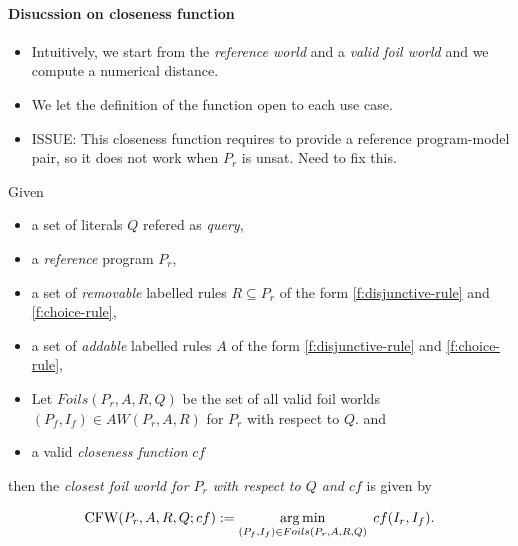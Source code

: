 \paragraph{Disucssion on closeness function}
\begin{itemize}
  \item Intuitively, we start from the \emph{reference world} and a \emph{valid foil world} and we compute a numerical distance.
  \item We let the definition of the function open to each use case.
  \item {\color{red} ISSUE: This closeness function requires to provide a reference program-model pair, so it does not work when $P_r$ is unsat. Need to fix this.}
\end{itemize}

\begin{definition}
  Given
  \begin{itemize}
    \item a set of literals $Q$ refered as \emph{query},
    \item a \emph{reference} program $P_r$,
    \item a set of \emph{removable} labelled rules $R \subseteq P_r$ of the form \eqref{f:disjunctive-rule} and \eqref{f:choice-rule},
    \item a set of \emph{addable} labelled rules $A$ of the form \eqref{f:disjunctive-rule} and \eqref{f:choice-rule},
    \item Let $Foils(P_r, A, R, Q)$ be the set of all valid foil worlds $(P_f, I_f) \in AW(P_r, A, R)$ for $P_r$ with respect to $Q$.
    and
    \item  a valid \emph{closeness function} $cf$
  \end{itemize}
  then
  the \emph{closest foil world for $P_r$ with respect to $Q$ and $cf$} is given by

  \[
  \mathrm{CFW}(P_r, A, R, Q;cf)
  := \operatorname*{arg\,min}_{(P_f, I_f) \in Foils(P_r, A, R, Q)} \; cf(I_r, I_f).
  \]

\end{definition}




